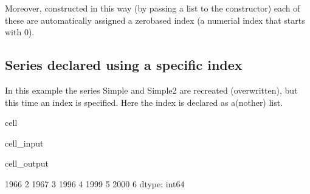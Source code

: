 \documentclass[letterpaper,10pt,english]{jupyterBook}
\begin{document}
\sphinxAtStartPar
Moreover, constructed in this way (by passing a list to the constructor) each of these  are automatically assigned a zero\sphinxhyphen{}based index (a numerial index that starts with 0).


\subsection{Series declared using a specific index}
\label{\detokenize{content/04_PythonEssentials/PythonPandasDataframes:series-declared-using-a-specific-index}}
\sphinxAtStartPar
In this example the series Simple and Simple2 are recreated (overwritten), but this time an index is specified. Here the index is declared as a(nother) list.

\begin{sphinxuseclass}{cell}\begin{sphinxVerbatimInput}

\begin{sphinxuseclass}{cell_input}
\begin{sphinxVerbatim}[commandchars=\\\{\}]
\PYG{p}{[}\PYG{p}{]}\PYG{p}{[}\PYG{p}{]}
\end{sphinxVerbatim}

\end{sphinxuseclass}\end{sphinxVerbatimInput}
\begin{sphinxVerbatimOutput}

\begin{sphinxuseclass}{cell_output}
\begin{sphinxVerbatim}[commandchars=\\\{\}]
1966    2
1967    3
1996    4
1999    5
2000    6
dtype: int64
\end{sphinxVerbatim}

\end{sphinxuseclass}\end{sphinxVerbatimOutput}

\end{sphinxuseclass}
\end{document}
